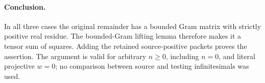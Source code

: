 \paragraph{Conclusion.}
In all three cases the original remainder has a bounded Gram matrix with
strictly positive real residue.  The bounded-Gram lifting lemma therefore
makes it a tensor sum of squares.  Adding the retained source-positive
packets proves the assertion.  The argument is valid for arbitrary $n\geq0$,
including $n=0$, and literal projective $w=0$; no comparison between source
and testing infinitesimals was used.

